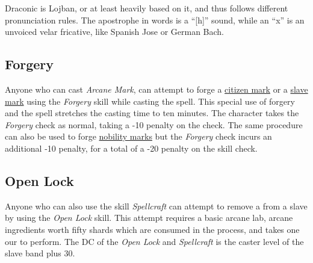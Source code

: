 \begin{note}
  Draconic is Lojban, or at least heavily based on it, and thus follows
  different pronunciation rules. The apostrophe in words is a ``[h]'' sound,
  while an ``x'' is an unvoiced velar fricative, like Spanish Jose or German
  Bach.
\end{note}

\subsection{Forgery}
\label{sec:Forgery}

Anyone who can cast \emph{Arcane Mark}, can attempt to forge a
\hyperref[sec:Citizen Mark]{citizen mark} or a \hyperref[sec:Slave Mark]{slave
mark} using the \emph{Forgery} skill while casting the spell. This special
use of forgery and the spell stretches the casting time to ten minutes. The
character takes the \emph{Forgery} check as normal, taking a -10 penalty on
the check. The same procedure can also be used to forge \hyperref[sec:Nobility
Mark]{nobility marks} but the \emph{Forgery} check incurs an additional -10
penalty, for a total of a -20 penalty on the skill check.

\subsection{Open Lock}
\label{sec:Open Lock}

Anyone who can also use the skill \emph{Spellcraft} can attempt to remove
a  from a slave by using the \emph{Open Lock} skill.
This attempt requires a basic arcane lab, arcane ingredients worth fifty
shards which are consumed in the process, and takes one our to perform.
The DC of the \emph{Open Lock} and \emph{Spellcraft} is the caster level
of the slave band plus 30.

\FloatBarrier
